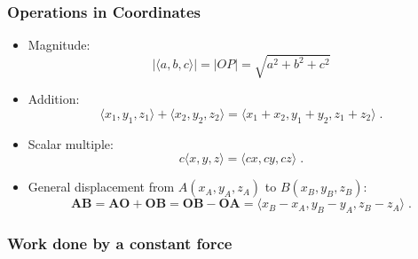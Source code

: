 \begin{frame}
\frametitle{Operations in Coordinates}

\begin{itemize}
 \item Magnitude:
%
$$|\langle a, b, c \rangle| = |OP| = \sqrt{a^2+b^2+c^2}$$
%
\item Addition:
%
$$\langle x_1,y_1,z_1 \rangle + \langle x_2, y_2,z_2\rangle = \langle x_1+x_2, y_1+y_2, z_1+z_2\rangle\; .$$
%
\item Scalar multiple:
%
$$c\langle x, y, z\rangle = \langle cx, cy, cz\rangle\; .$$
%
\item General displacement from $A(x_A, y_A, z_A)$ to $B(x_B, y_B, z_B)$:
%
$$\textbf{AB} = \textbf{AO} +\textbf{OB} = \textbf{OB} - \textbf{OA} = \langle x_B-x_A, y_B-y_A, z_B-z_A\rangle \; .$$
\end{itemize}

\end{frame}


\begin{frame}
 \frametitle{Work done by a constant force}



\end{frame}


